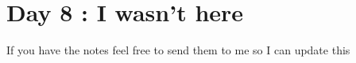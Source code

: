 \section{Day 8 : I wasn't here}

If you have the notes feel free to send them to me so I can update this